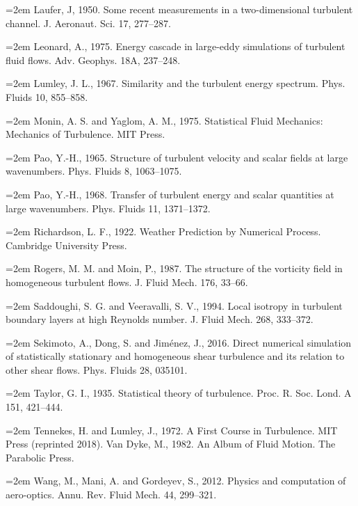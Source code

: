 \documentclass[12pt,a4paper,openany,fontset=none]{ctexbook}
\begin{document}
\par\hangindent=2em Laufer, J, 1950. Some recent measurements in a two-dimensional turbulent channel. J. Aeronaut. Sci. 17, 277–287.
\par\hangindent=2em Leonard, A., 1975. Energy cascade in large-eddy simulations of turbulent fluid flows. Adv. Geophys. 18A, 237–248.
\par\hangindent=2em Lumley, J. L., 1967. Similarity and the turbulent energy spectrum. Phys. Fluids 10, 855–858.
\par\hangindent=2em Monin, A. S. and Yaglom, A. M., 1975. Statistical Fluid Mechanics: Mechanics of Turbulence. MIT Press.
\par\hangindent=2em Pao, Y.-H., 1965. Structure of turbulent velocity and scalar fields at large wavenumbers. Phys. Fluids 8, 1063–1075.
\par\hangindent=2em Pao, Y.-H., 1968. Transfer of turbulent energy and scalar quantities at large wavenumbers. Phys. Fluids 11, 1371–1372.
\par\hangindent=2em Richardson, L. F., 1922. Weather Prediction by Numerical Process. Cambridge University Press.
\par\hangindent=2em Rogers, M. M. and Moin, P., 1987. The structure of the vorticity field in homogeneous turbulent flows. J. Fluid Mech. 176, 33–66.
\par\hangindent=2em Saddoughi, S. G. and Veeravalli, S. V., 1994. Local isotropy in turbulent boundary layers at high Reynolds number. J. Fluid Mech. 268, 333–372.
\par\hangindent=2em Sekimoto, A., Dong, S. and Jiménez, J., 2016. Direct numerical simulation of statistically stationary and homogeneous shear turbulence and its relation to other shear flows. Phys. Fluids 28, 035101.
\par\hangindent=2em Taylor, G. I., 1935. Statistical theory of turbulence. Proc. R. Soc. Lond. A 151, 421–444.
\par\hangindent=2em Tennekes, H. and Lumley, J., 1972. A First Course in Turbulence. MIT Press (reprinted 2018). Van Dyke, M., 1982. An Album of Fluid Motion. The Parabolic Press.
\par\hangindent=2em Wang, M., Mani, A. and Gordeyev, S., 2012. Physics and computation of aero-optics. Annu. Rev. Fluid Mech. 44, 299–321.
\end{document}
